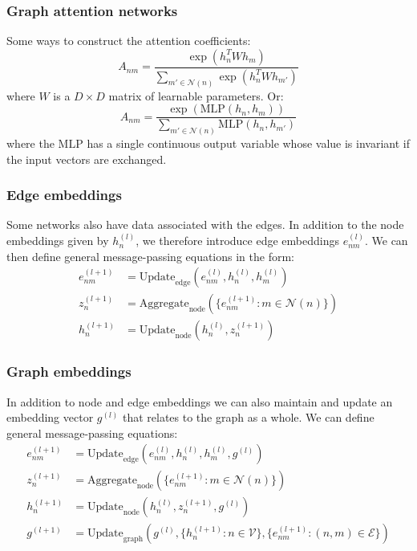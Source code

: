 \documentclass{beamer}
\begin{document}
\begin{frame}
    \frametitle{Graph attention networks}
    Some ways to construct the attention coefficients:
    \begin{equation*}
        A_{nm}=\frac{\exp(h_{n}^{T}Wh_{m})}{\sum_{m'\in\mathcal{N}(n)}\exp(h_{n}^{T}Wh_{m'})}
    \end{equation*}
    where $W$ is a $D\times{}D$ matrix of learnable parameters. Or:
    \begin{equation*}
        A_{nm}=\frac{\exp(\mathrm{MLP}(h_{n},h_{m}))}{\sum_{m'\in\mathcal{N}(n)}\mathrm{MLP}(h_{n},h_{m'})}
    \end{equation*}
    where the $\mathrm{MLP}$ has a single continuous output variable whose value is invariant if the input vectors are exchanged.
\end{frame}

\begin{frame}
    \frametitle{Edge embeddings}
    Some networks also have data associated with the edges. In addition to the node embeddings given by $h^{(l)}_{n}$, we therefore introduce edge embeddings $e^{(l)}_{nm}$. We can then define general message-passing equations in the form:
    \begin{align*}
        e^{(l+1)}_{nm}&=\mathrm{Update}_{\textrm{edge}}(e^{(l)}_{nm},h^{(l)}_{n},h^{(l)}_{m}) \\
        z^{(l+1)}_{n}&=\mathrm{Aggregate}_{\textrm{node}}(\{e^{(l+1)}_{nm}:m\in\mathcal{N}(n)\}) \\
        h^{(l+1)}_{n}&=\mathrm{Update}_{\textrm{node}}(h^{(l)}_{n},z^{(l+1)}_{n})
    \end{align*}
\end{frame}

\begin{frame}
    \frametitle{Graph embeddings}
    In addition to node and edge embeddings we can also maintain and update an embedding vector $g^{(l)}$ that relates to the graph as a whole. We can define general message-passing equations:
    \begin{align*}
        e^{(l+1)}_{nm}&=\mathrm{Update}_{\textrm{edge}}(e^{(l)}_{nm},h^{(l)}_{n},h^{(l)}_{m},g^{(l)}) \\
        z^{(l+1)}_{n}&=\mathrm{Aggregate}_{\textrm{node}}(\{e^{(l+1)}_{nm}:m\in\mathcal{N}(n)\}) \\
        h^{(l+1)}_{n}&=\mathrm{Update}_{\textrm{node}}(h^{(l)}_{n},z^{(l+1)}_{n},g^{(l)}) \\
        g^{(l+1)}&=\mathrm{Update}_{\textrm{graph}}(g^{(l)},\{h^{(l+1)}_{n}:n\in\mathcal{V}\},\{e^{(l+1)}_{nm}:(n,m)\in\mathcal{E}\})
    \end{align*}
\end{frame}
\end{document}
